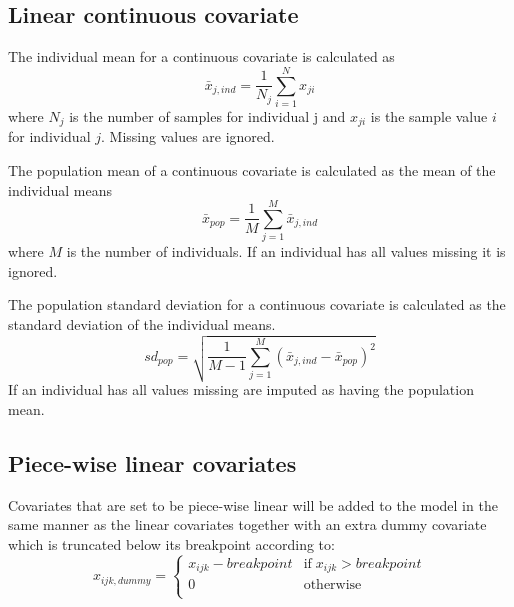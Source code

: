 \subsection{Linear continuous covariate}
The individual mean for a continuous covariate is calculated as
\[\bar{x}_{j,ind} = \frac{1}{N_j} \sum_{i=1}^N x_{ji}
\]
where $N_j$ is the number of samples for individual j and $x_{ji}$ is the sample value $i$ for individual $j$. Missing values are ignored.

The population mean of a continuous covariate is calculated as the mean of the individual means
\[\bar{x}_{pop} = \frac{1}{M} \sum_{j=1}^M \bar{x}_{j,ind}
\]
where $M$ is the number of individuals. If an individual has all values missing it is ignored.

The population standard deviation for a continuous covariate is calculated as the standard deviation of the individual means.
\[sd_{pop} = \sqrt{\frac{1}{M-1} \sum_{j=1}^M(\bar{x}_{j,ind} - \bar{x}_{pop})^2}
\]
If an individual has all values missing are imputed as having the population mean.

 
\subsection{Piece-wise linear covariates}
Covariates that are set to be piece-wise linear will be added to the model in the same manner as the linear covariates together with an extra dummy covariate which is truncated below its breakpoint according to:
\[   x_{ijk,dummy} = \left\{
        \begin{array}{ll}
            x_{ijk} - breakpoint & \textrm{if} \;  x_{ijk} > breakpoint \\
            0 & \textrm{otherwise} \\
        \end{array} 
    \right. \]

